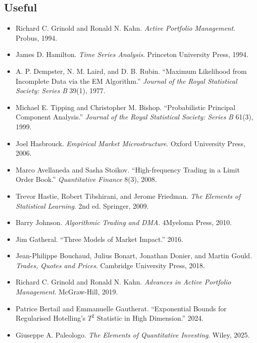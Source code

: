 \documentclass{article}
\begin{document}
\subsection{Useful}
\begin{itemize}
	\item Richard C. Grinold and Ronald N. Kahn. \textit{Active Portfolio Management}. Probus, 1994.
	\item James D. Hamilton. \textit{Time Series Analysis}. Princeton University Press, 1994.
	\item A. P. Dempster, N. M. Laird, and D. B. Rubin. ``Maximum Likelihood from Incomplete Data via the EM Algorithm.'' \textit{Journal of the Royal Statistical Society: Series B} 39(1), 1977.
	\item Michael E. Tipping and Christopher M. Bishop. ``Probabilistic Principal Component Analysis.'' \textit{Journal of the Royal Statistical Society: Series B} 61(3), 1999.
	\item Joel Hasbrouck. \textit{Empirical Market Microstructure}. Oxford University Press, 2006.
	\item Marco Avellaneda and Sasha Stoikov. ``High-frequency Trading in a Limit Order Book.'' \textit{Quantitative Finance} 8(3), 2008.
	\item Trevor Hastie, Robert Tibshirani, and Jerome Friedman. \textit{The Elements of Statistical Learning}. 2nd ed. Springer, 2009.
	\item Barry Johnson. \textit{Algorithmic Trading and DMA}. 4Myeloma Press, 2010.
	\item Jim Gatheral. ``Three Models of Market Impact.'' 2016.
	\item Jean-Philippe Bouchaud, Julius Bonart, Jonathan Donier, and Martin Gould. \textit{Trades, Quotes and Prices}. Cambridge University Press, 2018.
	\item Richard C. Grinold and Ronald N. Kahn. \textit{Advances in Active Portfolio Management}. McGraw-Hill, 2019.
	\item Patrice Bertail and Emmanuelle Gautherat. ``Exponential Bounds for Regularised Hotelling's $T^2$ Statistic in High Dimension.'' 2024.
	\item Giuseppe A. Paleologo. \textit{The Elements of Quantitative Investing}. Wiley, 2025.
\end{itemize}
\end{document}
